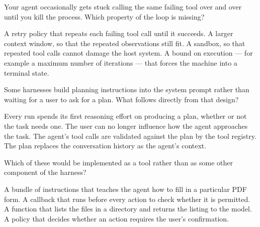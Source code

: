 \begin{questions}

\qitem Your agent occasionally gets stuck calling the same failing tool over and over until you kill the
process. Which property of the loop is missing?
\begin{choices}
  \choice A retry policy that repeats each failing tool call until it succeeds.
  \choice A larger context window, so that the repeated observations still fit.
  \choice A sandbox, so that repeated tool calls cannot damage the host system.
  \CorrectChoice A bound on execution --- for example a maximum number of iterations --- that forces the machine into a terminal state.
\end{choices}
\dontknow
{}

\qitem Some harnesses build planning instructions into the system prompt rather than waiting for a user
to ask for a plan. What follows directly from that design?
\begin{choices}
  \CorrectChoice Every run spends its first reasoning effort on producing a plan, whether or not the task needs one.
  \choice The user can no longer influence how the agent approaches the task.
  \choice The agent's tool calls are validated against the plan by the tool registry.
  \choice The plan replaces the conversation history as the agent's context.
\end{choices}
\dontknow
{}

\qitem Which of these would be implemented as a tool rather than as some other component of the harness?
\begin{choices}
  \choice A bundle of instructions that teaches the agent how to fill in a particular PDF form.
  \choice A callback that runs before every action to check whether it is permitted.
  \CorrectChoice A function that lists the files in a directory and returns the listing to the model.
  \choice A policy that decides whether an action requires the user's confirmation.
\end{choices}
\dontknow
{}


\end{questions}
